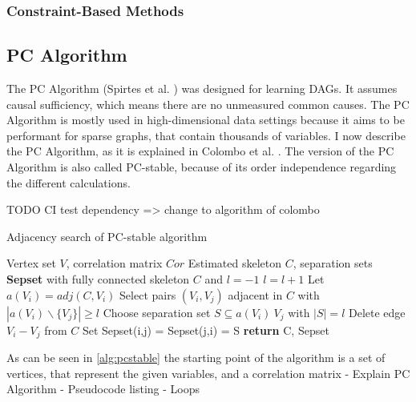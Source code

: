 \subsubsection{Constraint-Based Methods}



\subsection{PC Algorithm}
The PC Algorithm (Spirtes et al. \cite{spirtes_causation_1993}) was designed for learning DAGs. It assumes causal sufficiency, which means there are no unmeasured common causes. The PC Algorithm is mostly used in high-dimensional data settings because it aims to be performant for sparse graphs, that contain thousands of variables. \cite{kalisch_understanding_2010}
I now describe the PC Algorithm, as it is explained in Colombo et al. \cite{colombo_order-independent_nodate}. The version of the PC Algorithm is also called PC-stable, because of its order independence regarding the different calculations.

TODO CI test dependency => change to algorithm of colombo
\begin{algorithm}
    \caption{Adjacency search of PC-stable algorithm \cite{colombo_order-independent_nodate}}
    \label{alg:pcstable}
    \begin{algorithmic}[1]
    \Require Vertex set $V$, correlation matrix $Cor$
    \Ensure Estimated skeleton $C$, separation sets \textbf{Sepset}
    \State with fully connected skeleton $C$ and $l = -1$
    \Repeat 
        \State $l=l+1$
            \State Let $a(V_i) = adj(C,V_i)$
        \EndFor
        \Repeat
            \State Select pairs $(V_i,V_j)$ adjacent in $C$ with $|a(V_i)\backslash\{V_j\}| \geq l$
            \Repeat
                \State Choose separation set $S \subseteq a(V_i ) \ {V_j }$ with $| S | = l$
                    \State Delete edge $V_i - V_j$ from $C$
                    \State Set Sepset(i,j) = Sepset(j,i) = S
                \EndIf
    \State \textbf{return} C, Sepset
    \end{algorithmic}
\end{algorithm}

As can be seen in \ref{alg:pcstable} the starting point of the algorithm is a set of vertices, that represent the given variables, and a correlation matrix 
- Explain PC Algorithm
- Pseudocode listing
- Loops